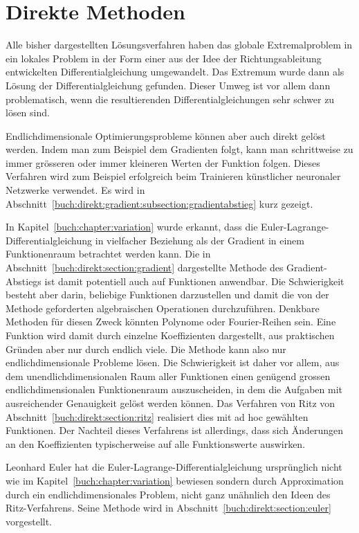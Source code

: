%
%
%
\chapter{Direkte Methoden
\label{buch:chapter:direkt}}
Alle bisher dargestellten Lösungsverfahren haben das globale Extremalproblem
in ein lokales Problem in der Form einer aus der Idee der Richtungsableitung
entwickelten Differentialgleichung umgewandelt.
Das Extremum wurde dann als Lösung der Differentialgleichung gefunden.
Dieser Umweg ist vor allem dann problematisch, wenn die resultierenden
Differentialgleichungen sehr schwer zu lösen sind.

Endlichdimensionale Optimierungsprobleme können aber auch direkt gelöst
werden.
Indem man zum Beispiel dem Gradienten folgt, kann man schrittweise
zu immer grösseren oder immer kleineren Werten der Funktion folgen.
Dieses Verfahren wird zum Beispiel erfolgreich beim Trainieren
künstlicher neuronaler Netzwerke verwendet.
Es wird in Abschnitt~\ref{buch:direkt:gradient:subsection:gradientabstieg}
kurz gezeigt.

In Kapitel~\ref{buch:chapter:variation} wurde erkannt, dass die
Euler-Lagrange-Differentialgleichung in vielfacher Beziehung als 
der Gradient in einem Funktionenraum betrachtet werden kann.
Die in Abschnitt~\ref{buch:direkt:section:gradient} dargestellte
Methode des Gradient-Abstiegs ist damit potentiell auch auf Funktionen
anwendbar.
Die Schwierigkeit besteht aber darin, beliebige Funktionen darzustellen
und damit die von der Methode geforderten algebraischen Operationen
durchzuführen.
Denkbare Methoden für diesen Zweck könnten Polynome oder Fourier-Reihen
sein.
Eine Funktion wird damit durch einzelne Koeffizienten dargestellt, aus
praktischen Gründen aber nur durch endlich viele.
Die Methode kann also nur endlichdimensionale Probleme lösen.
Die Schwierigkeit ist daher vor allem, aus dem unendlichdimensionalen
Raum aller Funktionen einen genügend grossen endlichdimensionalen
Funktionenraum auszuscheiden, in dem die Aufgaben mit ausreichender
Genauigkeit gelöst werden können.
Das Verfahren von Ritz von Abschnitt~\ref{buch:direkt:section:ritz}
realisiert dies mit ad hoc gewählten Funktionen.
Der Nachteil dieses Verfahrens ist allerdings, dass sich Änderungen an
den Koeffizienten typischerweise auf alle Funktionswerte auswirken.

Leonhard Euler hat die Euler-Lagrange-Differentialgleichung ursprünglich
nicht wie im Kapitel~\ref{buch:chapter:variation} bewiesen sondern durch
Approximation durch ein endlichdimensionales Problem, nicht ganz
unähnlich den Ideen des Ritz-Verfahrens.
Seine Methode wird in Abschnitt~\ref{buch:direkt:section:euler}
vorgestellt.




